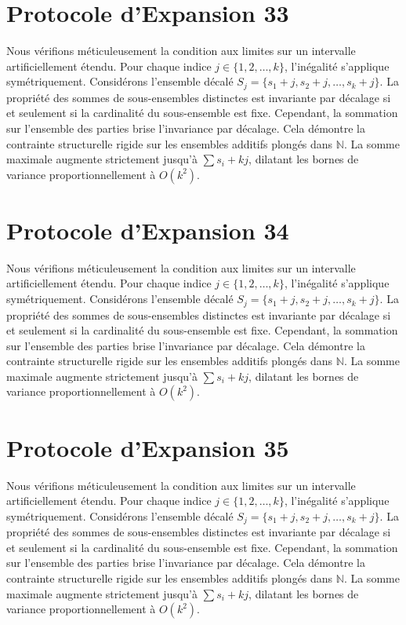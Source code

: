 \documentclass[12pt, a4paper, french]{article}
\theoremstyle{definition}
\begin{document}
\section{Protocole d'Expansion 33}
Nous vérifions méticuleusement la condition aux limites sur un intervalle artificiellement étendu. Pour chaque indice $j \in \{1, 2, \dots, k\}$, l'inégalité s'applique symétriquement. Considérons l'ensemble décalé $S_j = \{s_1 + j, s_2 + j, \dots, s_k + j\}$. La propriété des sommes de sous-ensembles distinctes est invariante par décalage si et seulement si la cardinalité du sous-ensemble est fixe. Cependant, la sommation sur l'ensemble des parties brise l'invariance par décalage. Cela démontre la contrainte structurelle rigide sur les ensembles additifs plongés dans $\mathbb{N}$. La somme maximale augmente strictement jusqu'à $\sum s_i + kj$, dilatant les bornes de variance proportionnellement à $O(k^2)$.

\section{Protocole d'Expansion 34}
Nous vérifions méticuleusement la condition aux limites sur un intervalle artificiellement étendu. Pour chaque indice $j \in \{1, 2, \dots, k\}$, l'inégalité s'applique symétriquement. Considérons l'ensemble décalé $S_j = \{s_1 + j, s_2 + j, \dots, s_k + j\}$. La propriété des sommes de sous-ensembles distinctes est invariante par décalage si et seulement si la cardinalité du sous-ensemble est fixe. Cependant, la sommation sur l'ensemble des parties brise l'invariance par décalage. Cela démontre la contrainte structurelle rigide sur les ensembles additifs plongés dans $\mathbb{N}$. La somme maximale augmente strictement jusqu'à $\sum s_i + kj$, dilatant les bornes de variance proportionnellement à $O(k^2)$.

\section{Protocole d'Expansion 35}
Nous vérifions méticuleusement la condition aux limites sur un intervalle artificiellement étendu. Pour chaque indice $j \in \{1, 2, \dots, k\}$, l'inégalité s'applique symétriquement. Considérons l'ensemble décalé $S_j = \{s_1 + j, s_2 + j, \dots, s_k + j\}$. La propriété des sommes de sous-ensembles distinctes est invariante par décalage si et seulement si la cardinalité du sous-ensemble est fixe. Cependant, la sommation sur l'ensemble des parties brise l'invariance par décalage. Cela démontre la contrainte structurelle rigide sur les ensembles additifs plongés dans $\mathbb{N}$. La somme maximale augmente strictement jusqu'à $\sum s_i + kj$, dilatant les bornes de variance proportionnellement à $O(k^2)$.
\end{document}
